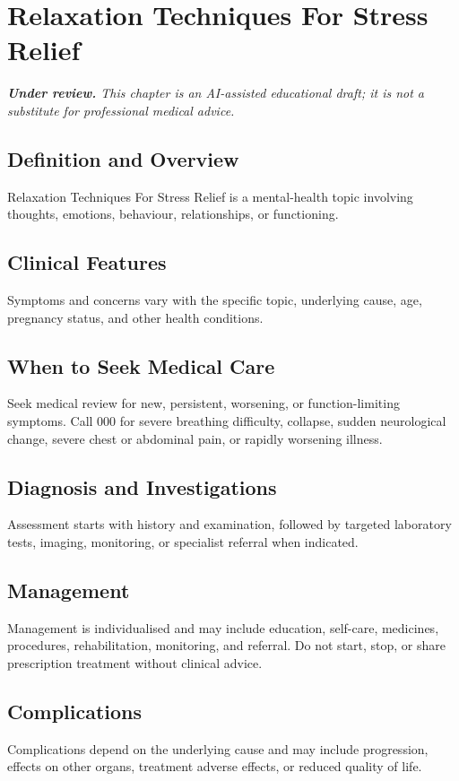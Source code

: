 \chapter{Relaxation Techniques For Stress Relief}

\medskip
\noindent\textit{\textbf{Under review.} This chapter is an AI-assisted educational draft; it is not a substitute for professional medical advice.}

\section*{Definition and Overview}
Relaxation Techniques For Stress Relief is a mental-health topic involving thoughts, emotions, behaviour, relationships, or functioning.

\section*{Clinical Features}
Symptoms and concerns vary with the specific topic, underlying cause, age, pregnancy status, and other health conditions.

\section*{When to Seek Medical Care}
Seek medical review for new, persistent, worsening, or function-limiting symptoms. Call 000 for severe breathing difficulty, collapse, sudden neurological change, severe chest or abdominal pain, or rapidly worsening illness.

\section*{Diagnosis and Investigations}
Assessment starts with history and examination, followed by targeted laboratory tests, imaging, monitoring, or specialist referral when indicated.

\section*{Management}
Management is individualised and may include education, self-care, medicines, procedures, rehabilitation, monitoring, and referral. Do not start, stop, or share prescription treatment without clinical advice.

\section*{Complications}
Complications depend on the underlying cause and may include progression, effects on other organs, treatment adverse effects, or reduced quality of life.

